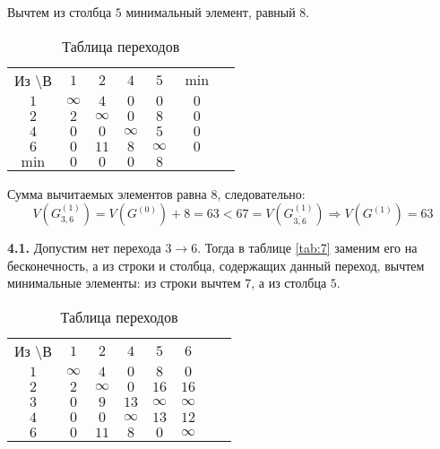 Вычтем из столбца $5$ минимальный элемент, равный $8$.

\begin{table}[H]
\begin{center}
	\def\tabcolsep{15pt}
	\caption{Таблица переходов}
	\label{tab:10}
	\begin{tabular}{|c||c|c|c|c|c|c|}
		\hline
		Из \textbackslash В & $1$ & $2$ & $4$ & $5$ & $\min$ \\
		\hhline{|=#=|=|=|=|=|}
		$1$ & $\infty$ & $4$ & $0$ & $0$ & $0$ \\
		\hline
		$2$ & $2$ & $\infty$ & $0$ & $8$ & $0$ \\
		\hline
		$4$ & $0$ & $0$ & $\infty$ & $5$ & $0$ \\
		\hline
		$6$ & $0$ & $11$ & $8$ & $\infty$ & $0$ \\
		\hhline{|=#=|=|=|=|=|}
		$\min$ & $0$ & $0$ & $0$ & $8$ & \\ 
		\hline
	\end{tabular}
\end{center}
\end{table}

Сумма вычитаемых элементов равна $8$, следовательно:
\begin{equation*}
V(G_{3,6}^{(1)}) = V(G^{(0)}) + 8 = 63 < 67 = V(G_{\overline{3,6}}^{(1)}) \Rightarrow V(G^{(1)}) = 63
\end{equation*}


\textbf{4.1.} Допустим нет перехода $3 \rightarrow 6$. Тогда в таблице \ref{tab:7} заменим его на бесконечность, а из строки и столбца, содержащих данный переход, вычтем минимальные элементы: из строки вычтем $7$, а из столбца $5$.

\begin{table}[H]
\begin{center}
	\def\tabcolsep{15pt}
	\caption{Таблица переходов}
	\label{tab:111}
	\begin{tabular}{|c||c|c|c|c|c|c|c|}
		\hline
		Из \textbackslash В & $1$ & $2$ & $4$ & $5$ & $6$ \\
		\hhline{|=#=|=|=|=|=|=|}
		$1$ & $\infty$ & $4$ & $0$ & $8$ & $0$ \\
		\hline
		$2$ & $2$ & $\infty$ & $0$ & $16$ & $16$ \\
		\hline
		$3$ & $0$ & $9$ & $13$ & $\infty$ & $\infty$ \\ 
		\hline
		$4$ & $0$ & $0$ & $\infty$ & $13$ & $12$ \\
		\hline
		$6$ & $0$ & $11$ & $8$ & $0$ & $\infty$ \\
		\hline
	\end{tabular}
\end{center}
\end{table}

